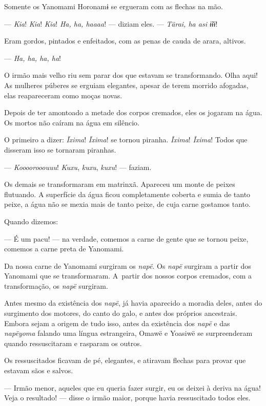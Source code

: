 Somente os Yanomami Horonamɨ se ergueram com as flechas na mão. 

--- \textit{Kia}! \textit{Kia}! \textit{Kia}! \textit{Ha, ha, haaaa}! --- diziam eles. --- \textit{Tãrai, ha asi ɨ̃ɨɨ}! 

Eram gordos, pintados e enfeitados, com as penas de cauda de arara,
altivos.

--- \textit{Ha, ha, ha, ha}! 

O irmão mais velho riu sem parar dos que estavam se transformando. Olha
 aqui! As mulheres púberes se erguiam elegantes, apesar de terem morrido
 afogadas, elas reapareceram como moças novas. 

Depois de ter amontoado a metade dos corpos cremados, eles os jogaram na
 água. Os mortos não caíram na água em silêncio. 

O primeiro a dizer: \textit{Ĩxima}! \textit{Ĩxima}! se tornou piranha. \textit{Ĩxima}! \textit{Ĩxima}! Todos
que disseram isso se tornaram piranhas. 

--- \textit{Koooorooouuu}! \textit{Kuxu}, \textit{kuxu}, \textit{kuxu}! --- faziam. 

Os demais se transformaram em matrinxã. Apareceu um monte de peixes
flutuando. A superfície da água ficou completamente coberta e sumia de
tanto peixe, a água não se mexia mais de tanto peixe, de cuja carne gostamos
tanto.

Quando dizemos:

--- É um pacu! --- na verdade, comemos a carne de gente que se tornou
peixe, comemos a carne preta de Yanomami. 

Da nossa carne de Yanomami surgiram os \textit{napë}. Os \textit{napë} surgiram a partir dos Yanomami que se transformaram. A~partir dos nossos corpos cremados, com a transformação, os \textit{napë} surgiram.

Antes mesmo da existência dos \textit{napë}, já havia aparecido a moradia
deles, antes do surgimento dos motores, do canto do galo, e antes dos
próprios ancestrais. Embora sejam a origem de tudo isso, antes da
existência dos \textit{napë} e das \textit{napëyoma} falando uma língua
estrangeira, Omawë e Yoasiwë se surpreenderam quando ressuscitaram e
rasparam os outros. 

Os ressuscitados ficavam de pé, elegantes, e atiravam flechas para
provar que estavam sãos e salvos.

--- Irmão menor, aqueles que eu queria fazer surgir, eu os
deixei à deriva na água! Veja o resultado! --- disse o irmão maior,
porque havia ressuscitado todos eles. 

